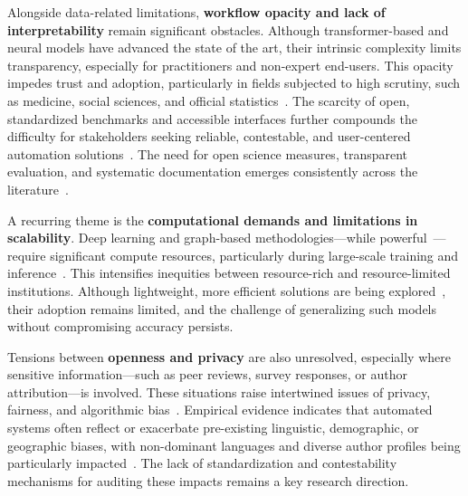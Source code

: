 \documentclass[sigconf]{acmart}
\begin{document}
Alongside data-related limitations, \textbf{workflow opacity and lack of interpretability} remain significant obstacles. Although transformer-based and neural models have advanced the state of the art, their intrinsic complexity limits transparency, especially for practitioners and non-expert end-users. This opacity impedes trust and adoption, particularly in fields subjected to high scrutiny, such as medicine, social sciences, and official statistics~\cite{ref61,ref62,ref64,ref70,ref84,ref86,ref88,ref90,ref91,ref92,ref93,ref94,ref95,ref104,ref105,ref108,ref110,ref112,ref114,ref117}. The scarcity of open, standardized benchmarks and accessible interfaces further compounds the difficulty for stakeholders seeking reliable, contestable, and user-centered automation solutions~\cite{ref63,ref64,ref68,ref70,ref73,ref78,ref80,ref86,ref87,ref88,ref89,ref90,ref91,ref92,ref93,ref95,ref96,ref97,ref100,ref103,ref104,ref105,ref108,ref109,ref110,ref111,ref112,ref113}. The need for open science measures, transparent evaluation, and systematic documentation emerges consistently across the literature~\cite{ref80,ref106}.

A recurring theme is the \textbf{computational demands and limitations in scalability}. Deep learning and graph-based methodologies---while powerful~\cite{ref41,ref42,ref60}---require significant compute resources, particularly during large-scale training and inference~\cite{ref41,ref61,ref62,ref63,ref64,ref68,ref70,ref76,ref78,ref80,ref81,ref82,ref84,ref86,ref87,ref88,ref89,ref90,ref91,ref92,ref93,ref94,ref95,ref99,ref100,ref109,ref110,ref111,ref113,ref114,ref115}. This intensifies inequities between resource-rich and resource-limited institutions. Although lightweight, more efficient solutions are being explored~\cite{ref104,ref99,ref102,ref115}, their adoption remains limited, and the challenge of generalizing such models without compromising accuracy persists.

Tensions between \textbf{openness and privacy} are also unresolved, especially where sensitive information---such as peer reviews, survey responses, or author attribution---is involved. These situations raise intertwined issues of privacy, fairness, and algorithmic bias~\cite{ref73,ref76,ref81,ref85,ref92,ref94,ref97,ref98,ref106,ref110,ref113,ref114,ref115,ref117}. Empirical evidence indicates that automated systems often reflect or exacerbate pre-existing linguistic, demographic, or geographic biases, with non-dominant languages and diverse author profiles being particularly impacted~\cite{ref61,ref74,ref90,ref92,ref94,ref95,ref104,ref105,ref110,ref112,ref113,ref114,ref115}. The lack of standardization and contestability mechanisms for auditing these impacts remains a key research direction.
\end{document}
